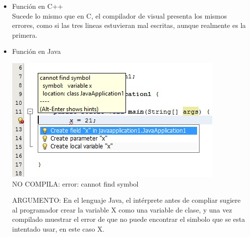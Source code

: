 \documentclass[12pt,oneside]{article}
\begin{document}
\begin{itemize}
\begin{itemize}
						\item {Función en C++}
							\\Sucede lo mismo que en C, el compilador de visual presenta los mismos errores, como si las tres lineas estuvieran mal escritas, aunque realmente es la primera.

						\item {Función en Java}
							\begin{center}
							\includegraphics[scale=0.9]{Imagenes/2.jpg}\\
							NO COMPILA: error: cannot find symbol
							\end{center}		
							ARGUMENTO: En el lenguaje Java, el intérprete antes de compliar sugiere al programador crear la variable X como una variable de clase, y una vez compilado muestrar el error de que no puede encontrar el simbolo que se esta 									intentado usar, en este caso X.									
					\end{itemize}


\end{itemize}
\end{document}
